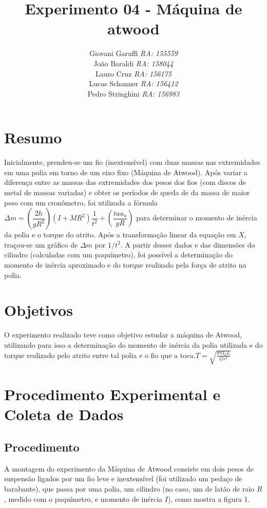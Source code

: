 \documentclass[12pt,a4paper]{article}
\begin{document}
\title{\vspace{70mm}\Huge Experimento 04 - Máquina de atwood}
\author{ Giovani Garuffi\qquad\hfill
		\textit {RA: 155559}\protect\\
		João Baraldi\hfill
		\textit{RA: 158044}\protect\\
		Lauro Cruz\hfill
		\textit{RA: 156175}\protect\\
		Lucas Schanner\hfill
		\textit{RA: 156412}\protect\\
		Pedro Stringhini\hfill
		\textit {RA: 156983}								
		}
\maketitle
\newpage
\section{Resumo}
Inicialmente, prendeu-se um fio (inextensível) com duas massas nas extremidades em uma polia em torno de um eixo fixo (Máquina de Atwood). Após variar a diferença entre as massas das extremidades dos pesos dos fios (com discos de metal de massas variadas) e obter os períodos de queda de da massa de maior peso com um cronômetro, foi utilizada a fórmula $\Delta m = (\dfrac{2h}{gR^2})(I + MR^2)\dfrac{1}{t^2}+(\dfrac{tau_a}{gR})$ para determinar o momento de inércia da polia e o torque do atrito.
Após a transformação linear da equação em $X$, traçou-se um gráfico de $\Delta m$ por $1/t^2$. A partir desses dados e das dimensões do cilindro (calculadas com um paquímetro), foi possível a determinação do momento de inércia aproximado e do torque realizado pela força de atrito na polia.

\section{Objetivos}
O experimento realizado teve como objetivo estudar a máquina de Atwood, utilizando para isso a determinação do momento de inércia da polia utilizada e do torque realizado pelo atrito entre tal polia e o fio que a toca.$T = \sqrt{\frac{8\pi I_0 L}{G r^4}}$


\section{Procedimento Experimental e Coleta de Dados}


\subsection{Procedimento}
A montagem do experimento da Máquina de Atwood consiste em dois pesos de suspensão ligados por um fio leve e inextensível (foi utilizado um pedaço de barabante), que passa por uma polia, um cilindro (no caso, um de latão de raio $R$, medido com o paquímetro, e momento de inércia $I$), como mostra a figura 1. \\
\end{document}

